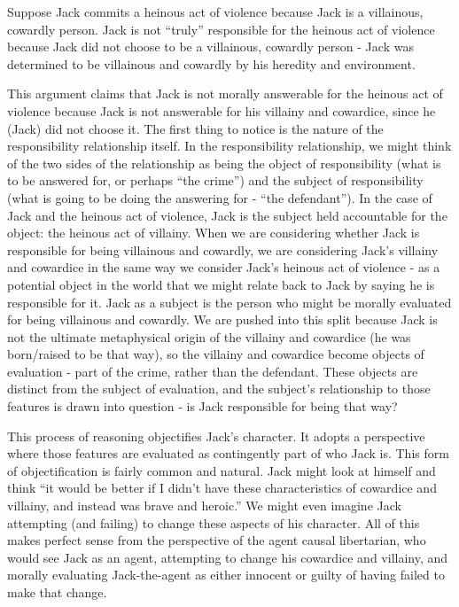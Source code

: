\documentclass[phd,12pt,oneside,paper=letterpaper]{ubcthesis}
\begin{document}
Suppose Jack commits a heinous act of violence because Jack is a villainous, cowardly person. Jack is not ``truly'' responsible for the heinous act of violence because Jack did not choose to be a villainous, cowardly person - Jack was determined to be villainous and cowardly by his heredity and environment.

This argument claims that Jack is not morally answerable for the heinous act of violence because Jack is not answerable for his villainy and cowardice, since he (Jack) did not choose it. The first thing to notice is the nature of the responsibility relationship itself. In the responsibility relationship, we might think of the two sides of the relationship as being the object of responsibility (what is to be answered for, or perhaps ``the crime'') and the subject of responsibility (what is going to be doing the answering for - ``the defendant'').  In the case of Jack and the heinous act of violence, Jack is the subject held accountable for the object: the heinous act of villainy. When we are considering whether Jack is responsible for being villainous and cowardly, we are considering Jack's villainy and cowardice in the same way we consider Jack's heinous act of violence - as a potential object in the world that we might relate back to Jack by saying he is responsible for it. Jack as a subject is the person who might be morally evaluated for being villainous and cowardly. We are pushed into this split because Jack is not the ultimate metaphysical origin of the villainy and cowardice (he was born/raised to be that way), so the villainy and cowardice become objects of evaluation - part of the crime, rather than the defendant. These objects are distinct from the subject of evaluation, and the subject's relationship to those features is drawn into question - is Jack responsible for being that way? 

This process of reasoning objectifies Jack's character. It adopts a perspective where those features  are evaluated as contingently part of who Jack is. This form of objectification is fairly common and natural. Jack  might look at himself and think ``it would be better if I didn't have these characteristics of cowardice and villainy, and instead was brave and heroic.'' We might even imagine Jack attempting (and failing) to change these aspects of his character. All of this makes perfect sense from the perspective of the agent causal libertarian, who would see Jack as an agent, attempting to change his cowardice and villainy, and morally evaluating Jack-the-agent as either innocent or guilty of having failed to make that change. 
\end{document}
